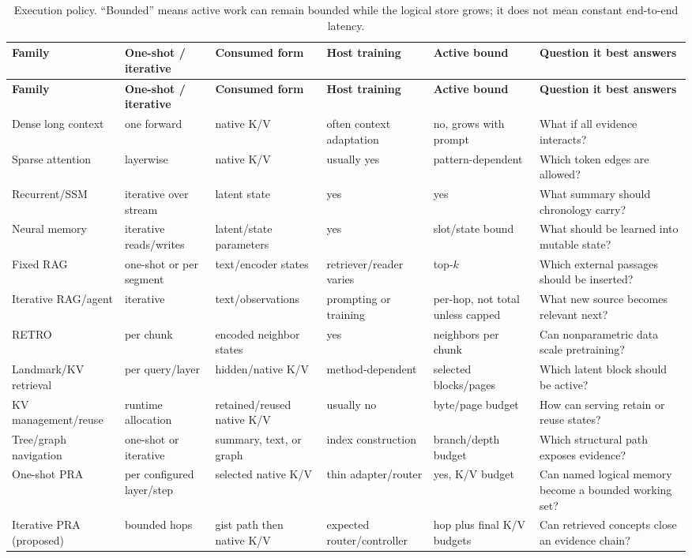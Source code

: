 \documentclass[10pt,a4paper]{article}
\begin{document}
\begin{longtable}{>{\raggedright\arraybackslash}p{2.8cm}>{\raggedright\arraybackslash}p{2.2cm}>{\raggedright\arraybackslash}p{3.0cm}>{\raggedright\arraybackslash}p{2.6cm}>{\raggedright\arraybackslash}p{2.2cm}>{\raggedright\arraybackslash}p{3.0cm}}
\caption{Execution policy. ``Bounded'' means active work can remain bounded while the logical
store grows; it does not mean constant end-to-end latency.}
\label{tab:memory-execution}\\
\toprule
\textbf{Family} & \textbf{One-shot / iterative} & \textbf{Consumed form} & \textbf{Host training} & \textbf{Active bound} & \textbf{Question it best answers}\\\midrule
\endfirsthead
\toprule
\textbf{Family} & \textbf{One-shot / iterative} & \textbf{Consumed form} & \textbf{Host training} & \textbf{Active bound} & \textbf{Question it best answers}\\\midrule
\endhead
Dense long context & one forward & native K/V & often context adaptation & no, grows with prompt & What if all evidence interacts?\\
Sparse attention & layerwise & native K/V & usually yes & pattern-dependent & Which token edges are allowed?\\
Recurrent/SSM & iterative over stream & latent state & yes & yes & What summary should chronology carry?\\
Neural memory & iterative reads/writes & latent/state parameters & yes & slot/state bound & What should be learned into mutable state?\\
Fixed RAG & one-shot or per segment & text/encoder states & retriever/reader varies & top-$k$ & Which external passages should be inserted?\\
Iterative RAG/agent & iterative & text/observations & prompting or training & per-hop, not total unless capped & What new source becomes relevant next?\\
RETRO & per chunk & encoded neighbor states & yes & neighbors per chunk & Can nonparametric data scale pretraining?\\
Landmark/KV retrieval & per query/layer & hidden/native K/V & method-dependent & selected blocks/pages & Which latent block should be active?\\
KV management/reuse & runtime allocation & retained/reused native K/V & usually no & byte/page budget & How can serving retain or reuse states?\\
Tree/graph navigation & one-shot or iterative & summary, text, or graph & index construction & branch/depth budget & Which structural path exposes evidence?\\
One-shot PRA & per configured layer/step & selected native K/V & thin adapter/router & yes, K/V budget & Can named logical memory become a bounded working set?\\
Iterative PRA (proposed) & bounded hops & gist path then native K/V & expected router/controller & hop plus final K/V budgets & Can retrieved concepts close an evidence chain?\\
\bottomrule
\end{longtable}
\endgroup
\end{document}

